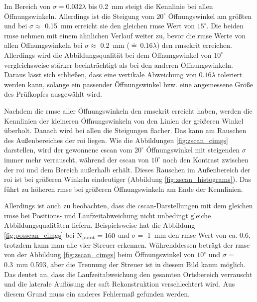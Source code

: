 Im Bereich von $\sigma = 0.032 \lambda$ bis \SI{0.2}{\milli\metre} steigt die Kennlinie bei allen Öffnungswinkeln. Allerdings ist die Steigung vom $20^{\circ}$ Öffnungswinkel am größten und bei $\sigma \approx$ \SI{0.15}{\milli\metre} erreicht sie den gleichen \acrshort{rmse} Wert von $15^{\circ}$. Die beiden \acrshort{rmse} nehmen mit einem ähnlichen Verlauf weiter zu, bevor die \acrshort{rmse} Werte von allen Öffnungswinkeln bei $\sigma \approx $ \SI{0.2}{\milli\metre} ($\hat{=} \ 0.16 \lambda$) den \acrshort{rmsekrit} erreichen. Allerdings wird die Abbildungsqualität bei dem Öffnungswinkel von $10^{\circ}$ vergleichsweise stärker beeinträchtigt als bei den anderen Öffnungswinkeln. Daraus lässt sich schließen, dass eine vertikale Abweichung von $0.16 \lambda$ toleriert werden kann, solange ein passender Öffnungswinkel bzw. eine angemessene Größe des Prüfkopfes ausgewählt wird. \par
Nachdem die \acrshort{rmse} aller Öffnungswinkeln den \acrshort{rmsekrit} erreicht haben, werden die Kennlinien der kleineren Öffnungswinkeln von den Linien der größeren Winkel überholt. Danach wird bei allen die Steigungen flacher. Das kann am Rauschen des Außenbereiches der \acrshort{roi} liegen. Wie die Abbildungen \ref{fig:zscan_cimgs} darstellen, wird der gewonnene \gls{cscan} vom $20^{\circ}$ Öffnungswinkel mit steigenden $\sigma$ immer mehr verrauscht, während der \gls{cscan} von $10^{\circ}$ noch den Kontrast zwischen der \acrshort{roi} und dem Bereich außerhalb erhält. Dieses Rauschen im Außenbereich der \acrshort{roi} ist bei größeren Winkeln eindeutiger (Abbildung \ref{fig:zscan_histograms}). Das führt zu höheren \acrshort{rmse} bei größeren Öffnungswinkeln am Ende der Kennlinien. \par
Allerdings ist auch zu beobachten, dass die \gls{cscan}-Darstellungen mit dem gleichen \acrshort{rmse} bei Positions- und Laufzeitabweichung nicht unbedingt gleiche Abbildungsqualitäten liefern. Beispielsweise hat die Abbildung \ref{fig:posscan_cimgs} bei $\operatorname{N}_{\operatorname{point}} = 160$ und $\sigma =$ \SI{1}{\milli\metre} den \acrshort{rmse} Wert von ca. 0.6, trotzdem kann man alle vier Streuer erkennen. Währenddessen beträgt der \acrshort{rmse} von der Abbildung \ref{fig:zscan_cimgs} beim Öffnungswinkel von $10^{\circ}$ und $\sigma =$ \SI{0.3}{\milli\metre} 0.593, aber die Trennung der Streuer ist in diesem Bild kaum möglich. Das deutet an, dass die Laufzeitabweichung den gesamten Ortsbereich verrauscht und die laterale Auflösung der \acrshort{saft} Rekonstruktion verschlechtert wird. Aus diesem Grund muss ein anderes Fehlermaß gefunden werden. \par

